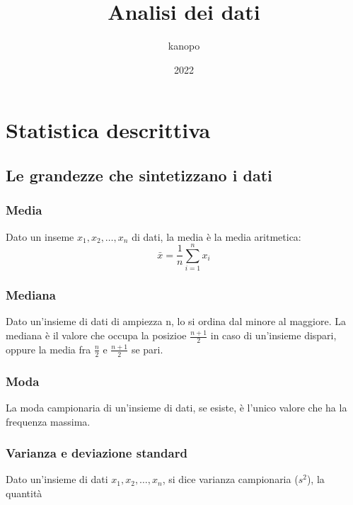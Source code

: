 \documentclass{article}
\begin{document}
    \author{kanopo}
    \title{Analisi dei dati}
    \date{2022}

    \maketitle
    \tableofcontents

    \listoffigures
    \listoftables

    \section{Statistica descrittiva}

    \subsection{Le grandezze che sintetizzano i dati}

    \subsubsection{Media}

    Dato un inseme $x_1, x_2, \dots, x_n$ di dati, la media è la media aritmetica:
    \begin{equation*}
        \bar{x} = \frac{1}{n} \sum_{i=1}^{n} x_i
    \end{equation*}

    \subsubsection{Mediana}
    Dato un'insieme di dati di ampiezza n, lo si ordina dal minore al maggiore. La mediana è il valore che
    occupa la posizioe $\frac{n+1}{2}$ in caso di un'insieme dispari, oppure
    la media fra $\frac{n}{2}$ e $\frac{n+1}{2}$ se pari.

    \subsubsection{Moda}
    La moda campionaria di un'insieme di dati, se esiste, è l'unico valore che ha la frequenza massima.


    \subsubsection{Varianza e deviazione standard}

    Dato un'insieme di dati $x_1, x_2, \dots, x_n$, si dice varianza campionaria ($s^2$), la quantità 
\end{document}
